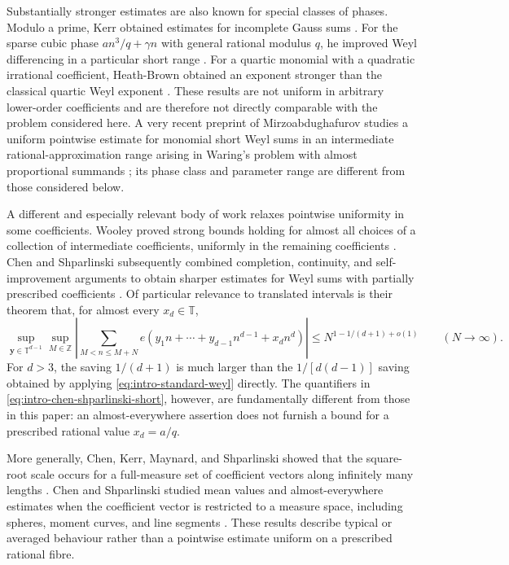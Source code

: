 \documentclass[11pt,reqno]{amsart}
\numberwithin{equation}{section}
\theoremstyle{definition}
\theoremstyle{remark}
\begin{document}
Substantially stronger estimates are also known for special classes of
phases.  Modulo a prime, Kerr obtained estimates for incomplete Gauss sums
\cite{Kerr2018}.  For the sparse cubic phase $an^3/q+\gamma n$ with general
rational modulus $q$, he improved Weyl differencing in a particular short
range \cite{KerrCubic2021}.  For a quartic monomial with a quadratic
irrational coefficient, Heath-Brown obtained an exponent stronger than the
classical quartic Weyl exponent \cite{HeathBrownQuartic2024}.  These results
are not uniform in arbitrary lower-order coefficients and are therefore not
directly comparable with the problem considered here.  A very recent
preprint of Mirzoabdughafurov studies a uniform pointwise estimate for
monomial short Weyl sums in an intermediate rational-approximation range
arising in Waring's problem with almost proportional summands
\cite{Mirzoabdughafurov2026}; its phase class and parameter range are
different from those considered below.

A different and especially relevant body of work relaxes pointwise
uniformity in some coefficients.  Wooley proved strong bounds holding for
almost all choices of a collection of intermediate coefficients, uniformly
in the remaining coefficients \cite{WooleyPerturbations2016}.  Chen and
Shparlinski subsequently combined completion, continuity, and
self-improvement arguments to obtain sharper estimates for Weyl sums with
partially prescribed coefficients \cite{ChenShparlinskiNewBounds2021}.  Of
particular relevance to translated intervals is their theorem that, for
almost every $x_d\in\mathbb T$,
\begin{equation}\label{eq:intro-chen-shparlinski-short}
  \sup_{\boldsymbol y\in\mathbb T^{d-1}}
  \sup_{M\in\mathbb Z}
  \left|
  \sum_{M<n\le M+N}
  e(y_1n+\cdots+y_{d-1}n^{d-1}+x_dn^d)
  \right|
  \le N^{1-1/(d+1)+o(1)}
  \qquad(N\to\infty).
\end{equation}
For $d>3$, the saving $1/(d+1)$ is much larger than the
$1/[d(d-1)]$ saving obtained by applying
\eqref{eq:intro-standard-weyl} directly.  The quantifiers in
\eqref{eq:intro-chen-shparlinski-short}, however, are fundamentally
different from those in this paper: an almost-everywhere assertion does not
furnish a bound for a prescribed rational value $x_d=a/q$.

More generally, Chen, Kerr, Maynard, and Shparlinski showed that the
square-root scale occurs for a full-measure set of coefficient vectors along
infinitely many lengths \cite{ChenKerrMaynardShparlinski2023}.  Chen and
Shparlinski studied mean values and almost-everywhere estimates when the
coefficient vector is restricted to a measure space, including spheres,
moment curves, and line segments
\cite{ChenShparlinskiRestricted2021}.  These results describe typical or
averaged behaviour rather than a pointwise estimate uniform on a prescribed
rational fibre.
\end{document}
